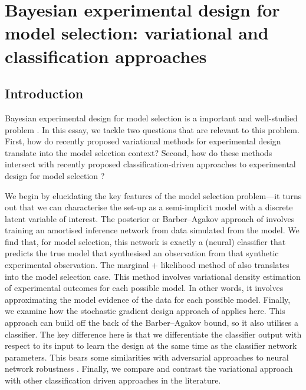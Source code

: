 \documentclass[a4paper, 10pt]{report}
\theoremstyle{plain}
\begin{document}
	
	\clearpage
	\section{Bayesian experimental design for model selection: variational and classification approaches}
	\label{sec:modelselection}
	
	\subsection{Introduction}
	Bayesian experimental design for model selection is a important and well-studied problem \citep{cavagnaro2010adaptive,vanlier2014optimal,hainy2018optimal}.
	In this essay, we tackle two questions that are relevant to this problem. First, how do recently proposed variational methods for experimental design \citep{foster2019variational,foster2020unified} translate into the model selection context? 
	Second, how do these methods intersect with recently proposed classification-driven approaches to experimental design for model selection \citep{hainy2018optimal}?
	
	We begin by elucidating the key features of the model selection problem---it turns out that we can characterise the set-up as a semi-implicit model with a discrete latent variable of interest.
	The posterior or Barber--Agakov approach of \citet{foster2019variational} involves training an amortised inference network from data simulated from the model. We find that, for model selection, this network is exactly a (neural) classifier that predicts the true model that synthesised an observation from that synthetic experimental observation.
	The marginal + likelihood method of \citet{foster2019variational} also translates into the model selection case. 
	This method involves variational density estimation of experimental outcomes for each possible model.
	In other words, it involves approximating the model evidence of the data for each possible model.
	Finally, we examine how the stochastic gradient design approach of \citet{foster2020unified} applies here.
	This approach can build off the back of the Barber--Agakov bound, so it also utilises a classifier.
	The key difference here is that we differentiate the classifier output with respect to its input to learn the design at the same time as the classifier network parameters. This bears some similarities with adversarial approaches to neural network robustness \citep{carlini2019evaluating}.
	Finally, we compare and contrast the variational approach with other classification driven approaches in the literature.
	
\end{document}
